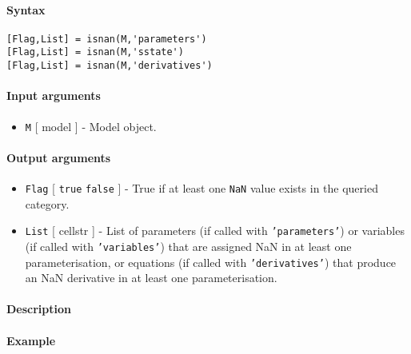 


	\paragraph{Syntax}

\begin{verbatim}
[Flag,List] = isnan(M,'parameters')
[Flag,List] = isnan(M,'sstate')
[Flag,List] = isnan(M,'derivatives')
\end{verbatim}

\paragraph{Input arguments}

\begin{itemize}
\itemsep1pt\parskip0pt
\item
  \texttt{M} {[} model {]} - Model object.
\end{itemize}

\paragraph{Output arguments}

\begin{itemize}
\item
  \texttt{Flag} {[} \texttt{true} \textbar{} \texttt{false} {]} - True
  if at least one \texttt{NaN} value exists in the queried category.
\item
  \texttt{List} {[} cellstr {]} - List of parameters (if called with
  \texttt{'parameters'}) or variables (if called with
  \texttt{'variables'}) that are assigned NaN in at least one
  parameterisation, or equations (if called with \texttt{'derivatives'})
  that produce an NaN derivative in at least one parameterisation.
\end{itemize}

\paragraph{Description}

\paragraph{Example}


